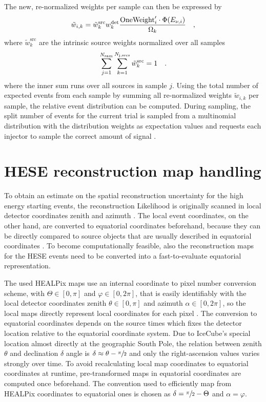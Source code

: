 The new, re-normalized weights per sample can then be expressed by
\begin{equation}
    \tilde{w}_{i,k}
    = \tilde{w}_k^\text{src} w_k^\text{det}
      \frac{\text{OneWeight}'_i \cdot \Phi(E_{\nu,i})}{\Omega_k}
  \quad\text{,}
\end{equation}
where $\tilde{w}_k^\text{src}$ are the intrinsic source weights normalized over all samples
\begin{equation}
  \sum_{j=1}^{N_\text{sam}} \sum_{k=1}^{N_\text{j,srcs}}
  \tilde{w}_k^\text{src} = 1
  \quad\text{.}
\end{equation}
where the inner sum runs over all sources in sample $j$.
Using the total number of expected events from each sample by summing all re-normalized weights $\tilde{w}_{i,k}$ per sample, the relative event distribution can be computed.
During sampling, the split number of events for the current trial is sampled from a multinomial distribution with the distribution weights as expectation values and requests each injector to sample the correct amount of signal .


\section{HESE reconstruction map handling}
To obtain an estimate on the spatial reconstruction uncertainty for the high energy starting events, the reconstruction Likelihood is originally scanned in local detector coordinates zenith and azimuth .
The local event coordinates, on the other hand, are converted to equatorial coordinates beforehand, because they can be directly compared to source objects that are usually described in equatorial coordinates .
To become computationally feasible, also the reconstruction maps for the HESE events need to be converted into a fast-to-evaluate equatorial representation.

The used HEALPix  maps use an internal coordinate to pixel number conversion scheme, with $\Theta\in[0, \pi]$ and $\varphi\in[0, 2\pi]$, that is easily identifiably with the local detector coordinates zenith $\theta\in[0, \pi]$ and azimuth $\alpha\in[0, 2\pi]$, so the local maps directly represent local coordinates for each pixel .
The conversion to equatorial coordinates depends on the source times which fixes the detector location relative to the equatorial coordinate system.
Due to IceCube's special location almost directly at the geographic South Pole, the relation between zenith $\theta$ and declination $\delta$ angle is $\delta \approx \theta - \sfrac{\pi}{2}$ and only the right-ascension values varies strongly over time.
To avoid recalculating local map coordinates to equatorial coordinates at runtime, pre-transformed maps in equatorial coordinates are computed once beforehand.
The convention used to efficiently map from HEALPix coordinates to equatorial ones is chosen as $\delta = \sfrac{\pi}{2} - \Theta$ and $\alpha = \varphi$.


